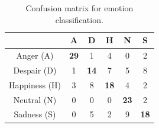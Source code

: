 \documentclass[twocolumn, 11pt]{article}
\begin{document}
\begin{table}[tbp]
\centering
\begin{tabular}{|c|c|c|c|c|c|}
\hline
&A & D & H & N & S  \\
\hline
Anger (A) & \bf 29 & 1 & 4 & 0 & 2 \\
Despair (D) & 1 & \bf 14 & 7 & 5 & 8 \\
Happiness (H) & 3 & 8 & \bf 18 & 4 & 2\\
Neutral (N) & 0 & 0 & 0 & \bf 23 & 2\\
Sadness (S) & 0 & 5 & 2 & 9 & \bf 18\\
\hline
\end{tabular}
\caption{\footnotesize Confusion matrix for emotion classification.}
\end{table}
\end{document}
